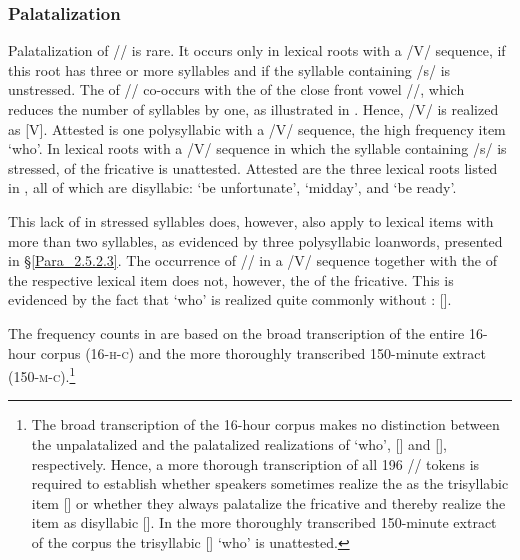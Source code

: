 \subsubsection[Palatalization]{Palatalization\label{Para_2.3.1.4}}

Palatalization of // is rare. It occurs only in lexical roots with a /V/ sequence, if this root has three or more syllables and if the syllable containing /s/ is unstressed. The  of // co-occurs with the  of the close front vowel //, which reduces the number of syllables by one, as illustrated in . Hence, /V/ is realized as [V]. Attested is one polysyllabic  with a /V/ sequence, the high frequency item  ‘who’. In lexical roots with a /V/ sequence in which the syllable containing /s/ is stressed,  of the fricative is unattested. Attested are the three lexical roots listed in , all of which are disyllabic:  ‘be unfortunate’,  ‘midday’, and  ‘be ready’.


This lack of  in stressed syllables does, however, also apply to lexical items with more than two syllables, as evidenced by three polysyllabic loanwords, presented in §\ref{Para_2.5.2.3}. The occurrence of // in a /V/ sequence together with the  of the respective lexical item does not, however,  the  of the fricative. This is evidenced by the fact that  ‘who’ is realized quite commonly without : [].



The frequency counts in  are based on the broad transcription of the entire 16-hour corpus (16-\textsc{h-c}) and the more thoroughly transcribed 150-minute extract (150-\textsc{m-c}).\footnote{The broad transcription of the 16-hour corpus makes no distinction between the unpalatalized and the palatalized realizations of  ‘who’, [] and [], respectively. Hence, a more thorough transcription of all 196 // tokens is required to establish whether speakers sometimes realize the  as the trisyllabic item [] or whether they always palatalize the fricative and thereby realize the item as disyllabic []. In the more thoroughly transcribed 150-minute extract of the corpus the trisyllabic  [] ‘who’ is unattested.}


